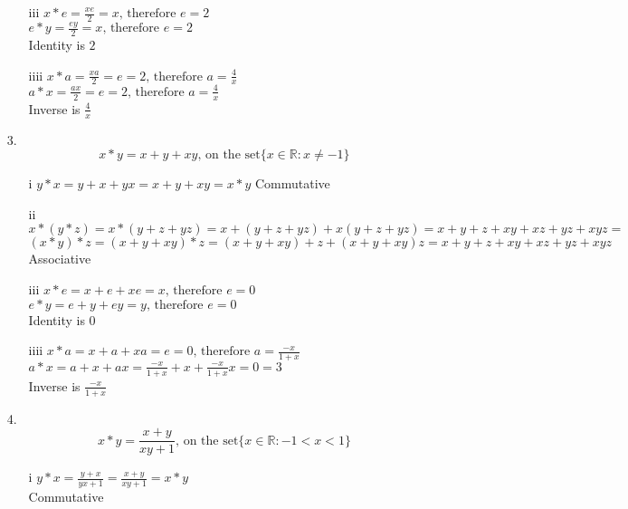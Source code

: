 \begin{enumerate}
\begin{enumerate}
\item[iii]
$x*e=\frac{xe}{2}=x \text{, therefore } e=2$ \\
$e*y=\frac{ey}{2}=x \text{, therefore } e=2$ \\
Identity is $2$

\item[iiii]
$x*a=\frac{xa}{2}=e=2 \text{, therefore } a=\frac{4}{x}$ \\
$a*x=\frac{ax}{2}=e=2 \text{, therefore } a=\frac{4}{x}$ \\
Inverse is $\frac{4}{x}$

\end{enumerate}

\item[3.]
\begin{equation}
x*y=x+y+xy \text{, on the set} \{x \in \mathbb{R}:x \neq -1\}
\end{equation}

\begin{enumerate}

\item[i]
$y*x=y+x+yx=x+y+xy=x*y$
Commutative

\item[ii]
$x*(y*z)=x*(y+z+yz)=x+(y+z+yz)+x(y+z+yz)=x+y+z+xy+xz+yz+xyz=$ \\
$(x*y)*z=(x+y+xy)*z=(x+y+xy)+z+(x+y+xy)z=x+y+z+xy+xz+yz+xyz$ \\
Associative

\item[iii]
$x*e=x+e+xe=x \text{, therefore } e=0$ \\
$e*y=e+y+ey=y \text{, therefore } e=0$ \\
Identity is $0$

\item[iiii]
$x*a=x+a+xa=e=0 \text{, therefore } a=\frac{-x}{1+x}$ \\
$a*x=a+x+ax=\frac{-x}{1+x}+x+\frac{-x}{1+x}x=0=3$ \\
Inverse is $\frac{-x}{1+x}$

\end{enumerate}

\item[4.]
\begin{equation}
x*y=\frac{x+y}{xy+1} \text{, on the set} \{x \in \mathbb{R}: -1 < x < 1\}
\end{equation}

\begin{enumerate}

\item[i]
$y*x=\frac{y+x}{yx+1} =\frac{x+y}{xy+1} =x*y$ \\
Commutative


\end{enumerate}
\end{enumerate}
